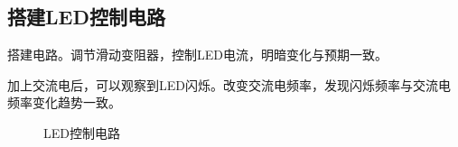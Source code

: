 \documentclass[UTF8]{ctexart}
\begin{document}
\subsection{搭建LED控制电路}
搭建电路。调节滑动变阻器，控制LED电流，明暗变化与预期一致。

加上交流电后，可以观察到LED闪烁。改变交流电频率，发现闪烁频率与交流电频率变化趋势一致。

\begin{figure}
\centering  %
\caption{LED控制电路}
\end{figure}
\end{document}
